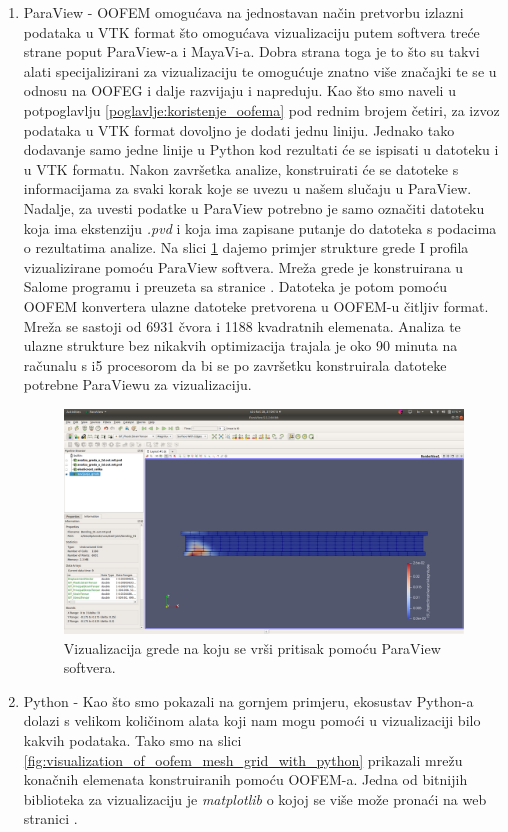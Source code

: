 \documentclass[a4paper,twoside,12pt]{memoir} %
\begin{document}
\begin{enumerate}
    \item ParaView - OOFEM omogućava na jednostavan način pretvorbu izlazni podataka u VTK format što omogućava vizualizaciju putem softvera treće strane poput ParaView-a i MayaVi-a. Dobra strana toga je to što su takvi alati specijalizirani za vizualizaciju te omogućuje znatno više značajki te se u odnosu na OOFEG i dalje razvijaju i napreduju. Kao što smo naveli u potpoglavlju \ref{poglavlje:koristenje_oofema} pod rednim brojem četiri, za izvoz podataka u VTK format dovoljno je dodati jednu liniju. Jednako tako dodavanje samo jedne linije u Python kod rezultati će se ispisati u datoteku i u VTK formatu. Nakon završetka analize, konstruirati će se datoteke s informacijama za svaki korak koje se uvezu u našem slučaju u ParaView. Nadalje, za uvesti podatke u ParaView potrebno je samo označiti datoteku koja ima ekstenziju \textit{.pvd} i koja ima zapisane putanje do datoteka s podacima o rezultatima analize. Na slici \ref{fig:paraview_example} dajemo primjer strukture grede I profila vizualizirane pomoću ParaView softvera. Mreža grede je konstruirana u Salome programu i preuzeta sa stranice \cite{oofem-web}. Datoteka je potom pomoću OOFEM konvertera ulazne datoteke pretvorena u OOFEM-u čitljiv format. Mreža se sastoji od 6931 čvora i 1188 kvadratnih elemenata. Analiza te ulazne strukture bez nikakvih optimizacija trajala je oko 90 minuta na računalu s i5 procesorom da bi se po završetku konstruirala datoteke potrebne ParaViewu za vizualizaciju.
        \begin{figure}[h!t]
        \begin{center}
        \includegraphics[scale=0.2]{pictures/chapter_oofem/paraview_beam_bending_full.png}
        \caption{Vizualizacija grede na koju se vrši pritisak pomoću ParaView softvera.}
        \label{fig:paraview_example}
        \end{center}
        \end{figure}
    \item Python - Kao što smo pokazali na gornjem primjeru, ekosustav Python-a dolazi s velikom količinom alata koji nam mogu pomoći u vizualizaciji bilo kakvih podataka. Tako smo na slici \ref{fig:visualization_of_oofem_mesh_grid_with_python} prikazali mrežu konačnih elemenata konstruiranih pomoću OOFEM-a. Jedna od bitnijih biblioteka za vizualizaciju je \textit{matplotlib} o kojoj se više može pronaći na web stranici \cite{matplotlib_web}.
\end{enumerate}
\end{document}
